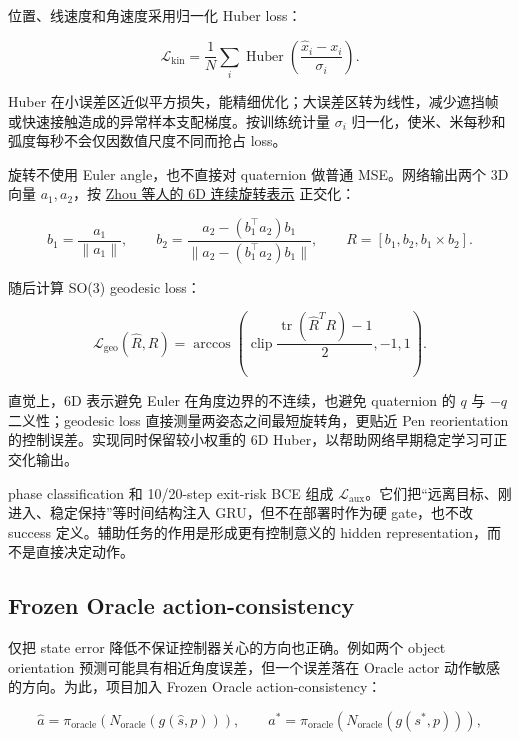 位置、线速度和角速度采用归一化 Huber loss：

\[
\mathcal L_{\text{kin}}
=\frac{1}{N}\sum_i
\operatorname{Huber}\!\left(
\frac{\hat x_i-x_i}{\sigma_i}
\right).
\]

Huber 在小误差区近似平方损失，能精细优化；大误差区转为线性，减少遮挡帧或快速接触造成的异常样本支配梯度。按训练统计量 \(\sigma_i\) 归一化，使米、米每秒和弧度每秒不会仅因数值尺度不同而抢占 loss。

旋转不使用 Euler angle，也不直接对 quaternion 做普通 MSE。网络输出两个 3D 向量 \(a_1,a_2\)，按 \href{https://openaccess.thecvf.com/content_CVPR_2019/html/Zhou_On_the_Continuity_of_Rotation_Representations_in_Neural_Networks_CVPR_2019_paper.html}{Zhou 等人的 6D 连续旋转表示} 正交化：

\[
b_1=\frac{a_1}{\lVert a_1\rVert},\qquad
b_2=\frac{a_2-(b_1^\top a_2)b_1}
{\lVert a_2-(b_1^\top a_2)b_1\rVert},\qquad
R=[b_1,b_2,b_1\times b_2].
\]

随后计算 SO(3) geodesic loss：

\[
\mathcal L_{\text{geo}}(\hat R,R)
=\arccos\!\left(
\operatorname{clip}\frac{\operatorname{tr}(\hat R^TR)-1}{2},-1,1
\right).
\]

直觉上，6D 表示避免 Euler 在角度边界的不连续，也避免 quaternion 的 \(q\) 与 \(-q\) 二义性；geodesic loss 直接测量两姿态之间最短旋转角，更贴近 Pen reorientation 的控制误差。实现同时保留较小权重的 6D Huber，以帮助网络早期稳定学习可正交化输出。

phase classification 和 10/20-step exit-risk BCE 组成 \(\mathcal L_{\text{aux}}\)。它们把``远离目标、刚进入、稳定保持''等时间结构注入 GRU，但不在部署时作为硬 gate，也不改 success 定义。辅助任务的作用是形成更有控制意义的 hidden representation，而不是直接决定动作。

\hypertarget{frozen-oracle-action-consistency}{%
\subsection{Frozen Oracle action-consistency}\label{frozen-oracle-action-consistency}}

仅把 state error 降低不保证控制器关心的方向也正确。例如两个 object orientation 预测可能具有相近角度误差，但一个误差落在 Oracle actor 动作敏感的方向。为此，项目加入 Frozen Oracle action-consistency：

\[
\hat a=\pi_{\text{oracle}}\!\left(
N_{\text{oracle}}(g(\hat s,p))
\right),\qquad
a^*=\pi_{\text{oracle}}\!\left(
N_{\text{oracle}}(g(s^*,p))
\right),
\]

